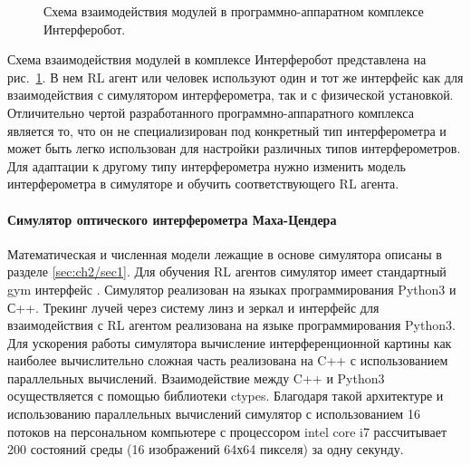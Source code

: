 \begin{figure}[ht]
\caption{Схема взаимодействия модулей в программно-аппаратном комплексе Интерферобот.}
\label{fig:interf_complex}
\end{figure}

Схема взаимодействия модулей в комплексе Интерферобот представлена на рис.~\ref{fig:interf_complex}. В нем RL агент или человек используют один и тот же интерфейс как для взаимодействия с симулятором интерферометра, так и с физической установкой. Отличительно чертой разработанного программно-аппаратного комплекса является то, что он не специализирован под конкретный тип интерферометра и может быть легко использован для настройки различных типов интерферометров. Для адаптации к другому типу интерферометра нужно изменить модель интерферометра в симуляторе и обучить соответствующего RL агента. 

\paragraph{Симулятор оптического интерферометра Маха-Цендера}
Математическая и численная модели лежащие в основе симулятора описаны в разделе \ref{sec:ch2/sec1}. Для обучения RL агентов симулятор имеет стандартный gym интерфейс \cite{brockman2016openai}. Симулятор реализован на языках программирования Python3 и С++. Трекинг лучей через систему линз и зеркал и интерфейс для взаимодействия с RL агентом реализована на языке программирования Python3. Для ускорения работы симулятора вычисление интерференционной картины как наиболее вычислительно сложная часть реализована на C++ с использованием параллельных вычислений. Взаимодействие между C++ и Python3 осуществляется с помощью библиотеки ctypes. Благодаря такой архитектуре и использованию параллельных вычислений симулятор с использованием 16 потоков на персональном компьютере с процессором intel core i7 рассчитывает 200 состояний среды (16 изображений 64х64 пикселя) за одну секунду. 

